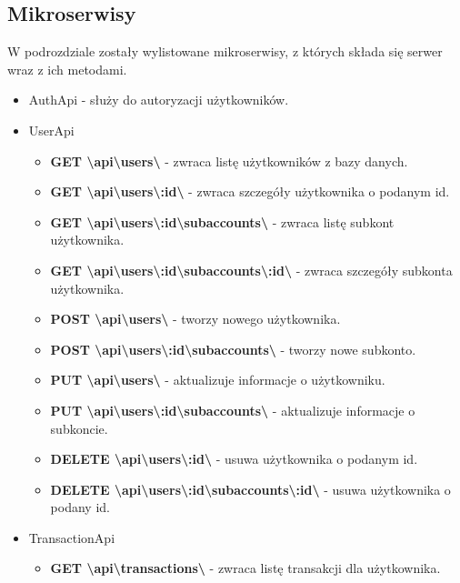 \documentclass{article}
\begin{document}
	\subsection{Mikroserwisy}
	W podrozdziale zostały wylistowane mikroserwisy, z których składa się serwer wraz z ich 
	metodami.
	\begin{itemize}
		\item AuthApi - służy do autoryzacji użytkowników.
		\item UserApi
			\begin{itemize}
				\item \textbf{GET \textbackslash{api}\textbackslash{users}\textbackslash} - zwraca listę użytkowników z bazy danych.
				\item \textbf{GET \textbackslash{api}\textbackslash{users}\textbackslash{:id}\textbackslash} - zwraca szczegóły użytkownika o podanym id.
				\item \textbf{GET \textbackslash{api}\textbackslash{users}\textbackslash{:id}\textbackslash{subaccounts}\textbackslash} - zwraca listę subkont użytkownika.
				\item \textbf{GET \textbackslash{api}\textbackslash{users}\textbackslash{:id}\textbackslash{subaccounts}\textbackslash{:id}\textbackslash} - zwraca szczegóły subkonta użytkownika.
				\item \textbf{POST \textbackslash{api}\textbackslash{users}\textbackslash} - tworzy nowego użytkownika.
				\item \textbf{POST \textbackslash{api}\textbackslash{users}\textbackslash{:id}\textbackslash{subaccounts}\textbackslash} - tworzy nowe subkonto.
				\item \textbf{PUT \textbackslash{api}\textbackslash{users}\textbackslash} - aktualizuje informacje o użytkowniku.
				\item \textbf{PUT \textbackslash{api}\textbackslash{users}\textbackslash{:id}\textbackslash{subaccounts}\textbackslash} - aktualizuje informacje o subkoncie.
				\item \textbf{DELETE \textbackslash{api}\textbackslash{users}\textbackslash{:id}\textbackslash} - usuwa użytkownika o podanym id.
				\item \textbf{DELETE \textbackslash{api}\textbackslash{users}\textbackslash{:id}\textbackslash{subaccounts}\textbackslash{:id}\textbackslash} - usuwa użytkownika o podany id.
			\end{itemize}
		\item TransactionApi
			\begin{itemize}
				\item \textbf{GET \textbackslash{api}\textbackslash{transactions}\textbackslash} - zwraca listę transakcji dla użytkownika.

\end{itemize}
\end{itemize}
\end{document}
